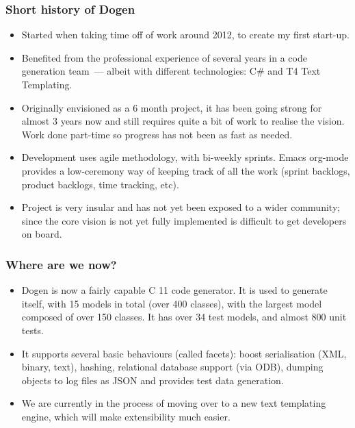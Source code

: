 \documentclass{beamer}
\begin{document}
\begin{frame}
\frametitle{Short history of Dogen}

\begin{itemize}

\item Started when taking time off of work around 2012, to create my
  first start-up.

\pause

\item Benefited from the professional experience of several years in a
  code generation team~--- albeit with different technologies: C\# and
  T4 Text Templating.

\pause

\item Originally envisioned as a 6 month project, it has been going
  strong for almost 3 years now and still requires quite a bit of work
  to realise the vision. Work done part-time so progress has not been
  as fast as needed.

\pause

\item Development uses agile methodology, with bi-weekly
  sprints. Emacs org-mode provides a low-ceremony way of keeping track
  of all the work (sprint backlogs, product backlogs, time tracking,
  etc).

\pause

\item Project is very insular and has not yet been exposed to a wider
  community; since the core vision is not yet fully implemented is
  difficult to get developers on board.

\end{itemize}

\end{frame}

\begin{frame}
\frametitle{Where are we now?}

\begin{itemize}

\item Dogen is now a fairly capable C 11 code generator. It is used
  to generate itself, with 15 models in total (over 400 classes), with
  the largest model composed of over 150 classes. It has over 34 test
  models, and almost 800 unit tests.

\pause

\item It supports several basic behaviours (called facets): boost
  serialisation (XML, binary, text), hashing, relational database
  support (via ODB), dumping objects to log files as JSON and provides
  test data generation.

\pause

\item We are currently in the process of moving over to a new text
  templating engine, which will make extensibility much easier.

\end{itemize}

\end{frame}
\end{document}
